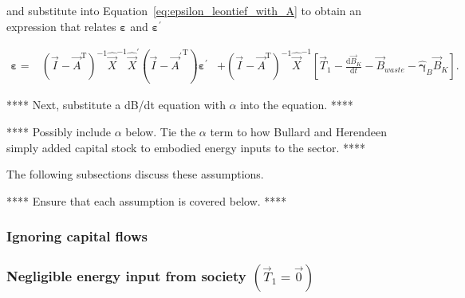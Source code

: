 \noindent{}and substitute into
Equation~\ref{eq:epsilon_leontief_with_A}
to obtain an expression that relates $\bm{\varepsilon}$ 
and $\bm{\varepsilon}^{'}$

\begin{align}
	\bm{\varepsilon}
	=& \left( \vec{I} - \vec{A}^{\mathrm{T}} \right)^{-1} \hat{\vec{X}}^{-1}
			\hat{\vec{X}}^{'} \left( \vec{I} - {\vec{A}^{'}}^{\mathrm{T}} \right) 
			\bm{\varepsilon^{'}} 
	& + \left( \vec{I} - \vec{A}^{\mathrm{T}} \right)^{-1} \hat{\vec{X}}^{\mathrm{-1}}
	\left[ \vec{T}_{1} - \frac{\mathrm{d}\vec{B}_{K}}{\mathrm{d}t}  
			- \vec{B}_{waste} - \hat{\bm{\gamma}}_{B} \vec{B}_{K} \right].
\end{align}

**** Next, substitute a dB/dt equation with $\alpha$ into the equation. ****

**** Possibly include $\alpha$ below. 
Tie the $\alpha$ term to how Bullard and Herendeen 
simply added capital stock to embodied energy inputs to the sector. ****

The following subsections discuss these assumptions.

**** Ensure that each assumption is covered below. ****



\subsubsection{Ignoring capital flows}



\subsubsection{Negligible energy input from society $\left( \vec{T}_{1} = \vec{0} \right)$}

